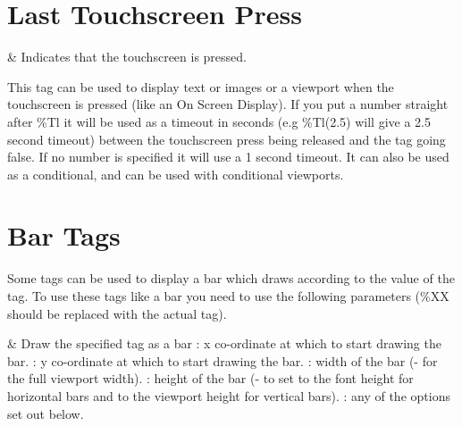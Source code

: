 {  \section{Last Touchscreen Press}
    \begin{tagmap}
       & Indicates that the touchscreen is pressed.\\
    \end{tagmap}
  This tag can be used to display text or images or a viewport when the
  touchscreen is pressed (like an On Screen Display). If you put a number
  straight after \%Tl it will be used as a timeout in seconds
  (e.g \%Tl(2.5) will give a 2.5 second timeout) between the touchscreen press
  being released and the tag going false. If no number is specified it will
  use a 1 second timeout.  It can also be used as a conditional, and can be
  used with conditional viewports.
}

\section{\label{ref:bar_tags}Bar Tags}
  Some tags can be used to display a bar which draws according to the value of
  the tag. To use these tags like a bar you need to use the following parameters
  (\%XX should be replaced with the actual tag).

\begin{tagmap}
    & Draw the specified tag as a bar\newline
      : x co-ordinate at which to start drawing the bar.\newline
      : y co-ordinate at which to start drawing the bar.\newline
      : width of the bar (- for the full viewport width).\newline
      : height of the bar (- to set to the font height for
        horizontal bars and to the viewport height for vertical bars).\newline
      : any of the options set out below.\\
\end{tagmap}

